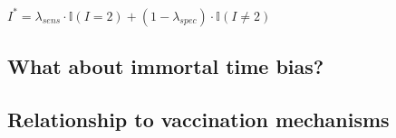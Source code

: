 \begin{appendix}
$I^* = \lambda_{sens} \cdot \mathbb{I}(I = 2) + (1 - \lambda_{spec}) \cdot \mathbb{I}(I \neq 2)$

\subsection{What about immortal time bias?}

\subsection{Relationship to vaccination mechanisms}





\end{appendix}
